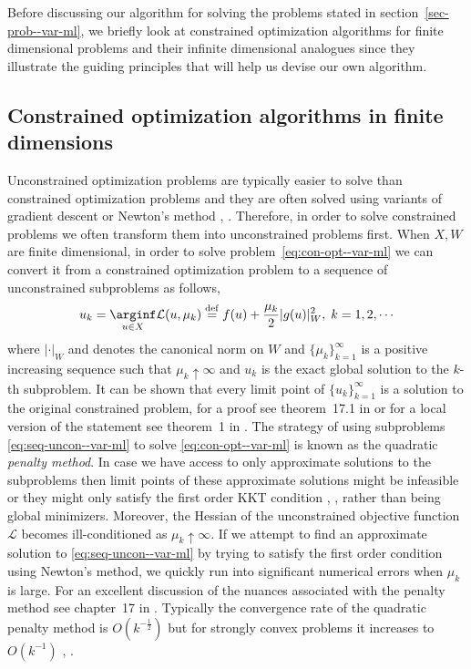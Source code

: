 Before discussing our algorithm for solving the problems stated in section~\ref{sec-prob--var-ml}, we briefly look at constrained optimization algorithms for finite dimensional problems and their infinite dimensional analogues since they illustrate the guiding principles that will help us devise our own algorithm. 


\subsection{Constrained optimization algorithms in finite dimensions}
Unconstrained optimization problems are typically easier to solve than constrained optimization problems and they are often solved using variants of gradient descent or Newton's method \cite{bonnans2006numerical}, \cite{jorge2006numerical}. Therefore, in order to solve constrained problems we often transform them into unconstrained problems first. When $X, W$ are finite dimensional, in order to solve problem~\eqref{eq:con-opt--var-ml} we can convert it from a constrained optimization problem to a sequence of unconstrained subproblems as follows,
\begin{align}
    u_k=\underset{u\in X}\arginf \mathcal L(u, \mu_k)\stackrel{\rm def}{=}f(u) + \frac{\mu_k}{2}|g(u)|_W^2,\;k=1,2,\cdots\label{eq:seq-uncon--var-ml}
\end{align}
where $|\cdot|_W$ and  denotes the canonical norm on $W$ and $\{\mu_k\}_{k=1}^\infty$ is a positive increasing sequence such that $\mu_k\uparrow\infty$ and $u_k$ is the exact global solution to the $k$-th subproblem. It can be shown that every limit point of $\{u_k\}_{k=1}^\infty$ is a solution to the original constrained problem, for a proof see theorem~17.1 in \cite{jorge2006numerical} or for a local version of the statement see theorem~1 in \cite{polyak1971convergence}. The strategy of using subproblems \eqref{eq:seq-uncon--var-ml} to solve \eqref{eq:con-opt--var-ml} is known as the quadratic \textit{penalty method}. In case we have access to only approximate solutions to the subproblems then limit points of these approximate solutions might be infeasible or they might only satisfy the first order KKT condition  \cite{kuhn2013nonlinear}, \cite{gordon2012karush}, \cite{boltyanski1998geometric} rather than being global minimizers. Moreover, the Hessian of the unconstrained objective function $\mathcal L$ becomes ill-conditioned as $\mu_k\uparrow\infty$. If we attempt to find an approximate solution to \eqref{eq:seq-uncon--var-ml} by trying to satisfy the first order condition using Newton's method, we quickly run into significant numerical errors when $\mu_k$ is large. For an excellent discussion of the nuances associated with the penalty method see chapter~17 in \cite{jorge2006numerical}. Typically the convergence rate of the quadratic penalty method is $O(k^{-\frac{1}{2}})$ but for strongly convex problems it increases to $O(k^{-1}) $  \cite{li2017convergence}, \cite{polyak1971convergence}.


